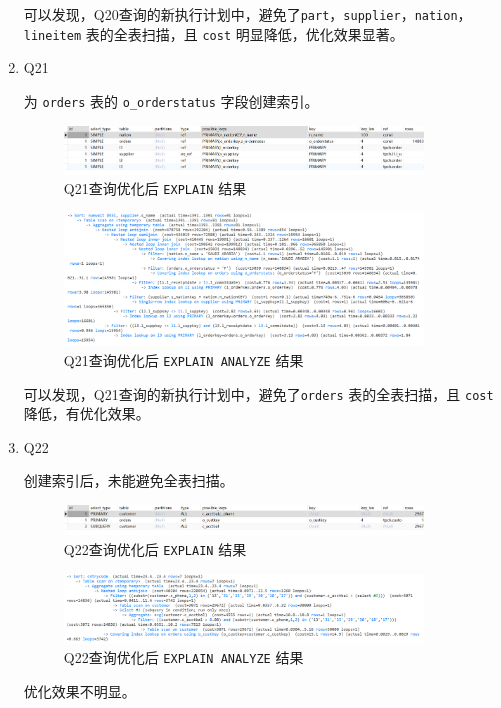 \documentclass{article}
\renewcommand\tt{\texttt}
\begin{document}
\begin{enumerate}
可以发现，Q20查询的新执行计划中，避免了\tt{part}，\tt{supplier}，\tt{nation}，\tt{lineitem} 表的全表扫描，且 \tt{cost} 明显降低，优化效果显著。

  \item Q21
  
为 \tt{orders} 表的 \tt{o\_orderstatus} 字段创建索引。

\begin{figure}[H]
\centering
\includegraphics[width=0.9\textwidth]{img/85.png}
\caption{Q21查询优化后 \tt{EXPLAIN} 结果}
\end{figure}

\begin{figure}[H]
\centering
\includegraphics[width=0.9\textwidth]{img/86.png}
\caption{Q21查询优化后 \tt{EXPLAIN ANALYZE} 结果}
\end{figure}

可以发现，Q21查询的新执行计划中，避免了\tt{orders} 表的全表扫描，且 \tt{cost} 降低，有优化效果。

  \item Q22
  
创建索引后，未能避免全表扫描。

\begin{figure}[H]
\centering
\includegraphics[width=0.9\textwidth]{img/87.png}
\caption{Q22查询优化后 \tt{EXPLAIN} 结果}
\end{figure}

\begin{figure}[H]
\centering
\includegraphics[width=0.9\textwidth]{img/88.png}
\caption{Q22查询优化后 \tt{EXPLAIN ANALYZE} 结果}
\end{figure}

优化效果不明显。


\end{enumerate}
\end{document}
